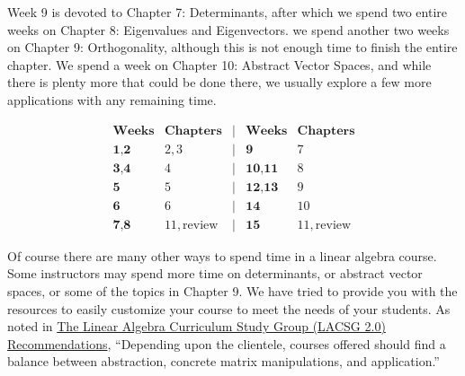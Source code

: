 \documentclass{ximera}
\begin{document}
Week 9 is devoted to Chapter 7: Determinants, after which we spend two entire weeks on Chapter 8: Eigenvalues and Eigenvectors.  we spend another two weeks on Chapter 9: Orthogonality, although this is not enough time to finish the entire chapter.  We spend a week on Chapter 10: Abstract Vector Spaces, and while there is plenty more that could be done there, we usually explore a few more applications with any remaining time.


$$
\begin{array}{ccccc}
\hline
		\textbf{Weeks} & \textbf{Chapters} & | & \textbf{Weeks} & \textbf{Chapters} \\ \hline
		\textbf{1,2} & 2,3 & | & \textbf{9} &  7 \\
		\textbf{3,4} &  4 & | & \textbf{10,11} &  8  \\
		\textbf{5} &  5 & | & \textbf{12,13} &  9 \\
		\textbf{6} &  6 & | & \textbf{14} &  10\\
		\textbf{7,8} &  11, \text{review} & | & \textbf{15} &  11, \text{review}
  
 \end{array}
$$

Of course there are many other ways to spend time in a linear algebra course.  Some instructors may spend more time on determinants, or abstract vector spaces, or some of the topics in Chapter 9.  We have tried to provide you with the resources to easily customize your course to meet the needs of your students.  As noted in \href{https://dx.doi.org/10.1090/noti2479}{The Linear Algebra Curriculum Study Group (LACSG 2.0) Recommendations}, ``Depending upon the clientele, courses offered
should find a balance between abstraction, concrete matrix manipulations, and application.'' 



\end{document}
